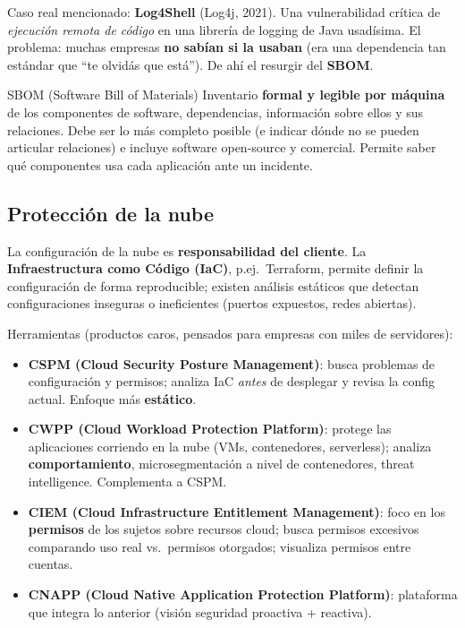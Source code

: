 \documentclass[../main.tex]{subfiles}
\begin{document}
\begin{destacado}
Caso real mencionado: \textbf{Log4Shell} (Log4j, 2021). Una vulnerabilidad
crítica de \emph{ejecución remota de código} en una librería de logging de Java
usadísima. El problema: muchas empresas \textbf{no sabían si la usaban} (era una
dependencia tan estándar que ``te olvidás que está''). De ahí el resurgir del
\textbf{SBOM}.
\end{destacado}

\begin{definicion}{SBOM (Software Bill of Materials)}
Inventario \textbf{formal y legible por máquina} de los componentes de software,
dependencias, información sobre ellos y sus relaciones. Debe ser lo más completo
posible (e indicar dónde no se pueden articular relaciones) e incluye software
open-source y comercial. Permite saber qué componentes usa cada aplicación ante
un incidente.
\end{definicion}

\subsection{Protección de la nube}

La configuración de la nube es \textbf{responsabilidad del cliente}. La
\textbf{Infraestructura como Código (IaC)}, p.ej.\ Terraform, permite definir la
configuración de forma reproducible; existen análisis estáticos que detectan
configuraciones inseguras o ineficientes (puertos expuestos, redes abiertas).

Herramientas (productos caros, pensados para empresas con miles de servidores):
\begin{itemize}
  \item \textbf{CSPM (Cloud Security Posture Management)}: busca problemas de
    configuración y permisos; analiza IaC \emph{antes} de desplegar y revisa la
    config actual. Enfoque más \textbf{estático}.
  \item \textbf{CWPP (Cloud Workload Protection Platform)}: protege las
    aplicaciones corriendo en la nube (VMs, contenedores, serverless); analiza
    \textbf{comportamiento}, microsegmentación a nivel de contenedores, threat
    intelligence. Complementa a CSPM.
  \item \textbf{CIEM (Cloud Infrastructure Entitlement Management)}: foco en los
    \textbf{permisos} de los sujetos sobre recursos cloud; busca permisos
    excesivos comparando uso real vs.\ permisos otorgados; visualiza permisos
    entre cuentas.
  \item \textbf{CNAPP (Cloud Native Application Protection Platform)}:
    plataforma que integra lo anterior (visión seguridad proactiva +
    reactiva).
\end{itemize}
\end{document}
